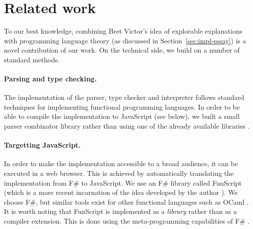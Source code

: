 \section{Related work}
\label{sec:impl-related}

To our best knowledge, combining Bret Victor's idea of explorable explanations with programming
language theory (as discussed in Section~\ref{sec:impl-essay}) is a novel contribution of our work.
On the technical side, we build on a number of standard methods.

\paragraph{Parsing and type checking.} The implementation of the parser, type checker and
interpreter follows standard techniques for implementing functional programming languages.
In order to be able to compile the implementation to JavaScript (see below), we built a
small parser combinator library \cite{monad-parsing} rather than using one of the already
available libraries \cite{other-fparsec}.

\paragraph{Targetting JavaScript.} In order to make the implementation accessible to a broad
audience, it can be executed in a web browser. This is achieved by automatically translating the
implementation from F\# to JavaScript. We use an F\# library called FunScript \cite{other-funscript}
(which is a more recent incarnation of the idea developed by the author \cite{app-fsharp-webtools}).
We choose F\#, but similar tools exist for other functional languages such as OCaml \cite{other-js-ocaml}.
It is worth noting that FunScript is implemented as a \emph{library} rather than as a compiler
extension. This is done using the meta-programming capabilities of F\# \cite{app-fsharp-metaprog}.

